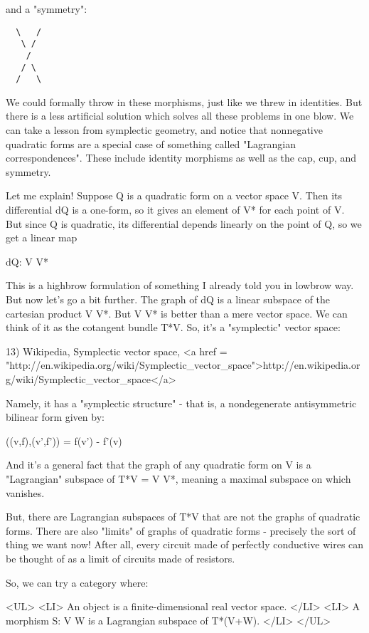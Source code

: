 and a "symmetry":

\begin{verbatim}
  \   /
   \ /
    /
   / \
  /   \
\end{verbatim}
    
We could formally throw in these morphisms, just like we threw in
identities.  But there is a less artificial solution which solves all
these problems in one blow.  We can take a lesson from symplectic
geometry, and notice that nonnegative quadratic forms are a special
case of something called "Lagrangian correspondences".
These include identity morphisms as well as the cap, cup, and
symmetry.

Let me explain!  Suppose Q is a quadratic form on a vector space V.
Then its differential dQ is a one-form, so it gives an element of V*
for each point of V.  But since Q is quadratic, its differential
depends linearly on the point of Q, so we get a linear map

dQ: V \to  V*

This is a highbrow formulation of something I already told you in
lowbrow way.  But now let's go a bit further.  The graph of dQ is a
linear subspace of the cartesian product V \times  V*.  But V \times 
V* is better than a mere vector space.  We can think of it as the
cotangent bundle T*V.  So, it's a "symplectic" vector space:

13) Wikipedia, Symplectic vector space,
<a href = "http://en.wikipedia.org/wiki/Symplectic_vector_space">http://en.wikipedia.org/wiki/Symplectic_vector_space</a>

Namely, it has a "symplectic structure" - that is, a nondegenerate
antisymmetric bilinear form \omega  given by:

\omega ((v,f),(v',f')) = f(v') - f'(v)

And it's a general fact that the graph of any quadratic form on V is a
"Lagrangian" subspace of T*V = V \times  V*, meaning a
maximal subspace on which \omega  vanishes.

But, there are Lagrangian subspaces of T*V that are not the graphs of
quadratic forms.  There are also "limits" of graphs of quadratic
forms - precisely the sort of thing we want now!  After all, every
circuit made of perfectly conductive wires can be thought of as a 
limit of circuits made of resistors.

So, we can try a category where:

<UL>
<LI>
  An object is a finite-dimensional real vector space.  
</LI>
<LI>
  A morphism S: V \to  W is a Lagrangian subspace of T*(V+W).
</LI>
</UL>

